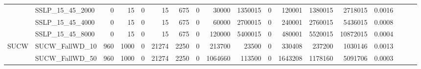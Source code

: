 \begin{landscape}
\begin{longtable}[c]{llrrrrrrrrrrrrrlll}
		& SSLP\_15\_45\_2000           & 0                           & 15                         & 0                          & 15                          & 675                        & 0                          & 30000                      & 1350015                   & 0                         & 120001                     & 1380015                    & 2718015                        & 0.0016                        &                          &                          &                          \\
		& SSLP\_15\_45\_4000           & 0                           & 15                         & 0                          & 15                          & 675                        & 0                          & 60000                      & 2700015                   & 0                         & 240001                     & 2760015                    & 5436015                        & 0.0008                        &                          &                          &                          \\
		& SSLP\_15\_45\_8000           & 0                           & 15                         & 0                          & 15                          & 675                        & 0                          & 120000                     & 5400015                   & 0                         & 480001                     & 5520015                    & 10872015                       & 0.0004                        &                          &                          &                          \\ \hline
		\multirow{24}{*}{SUCW}      & SUCW\_FallWD\_10             & 960                         & 1000                       & 0                          & 21274                       & 2250                       & 0                          & 213700                     & 23500                     & 0                         & 330408                     & 237200                     & 1030146                        & 0.0013                        &                          &                          &                          \\
		& SUCW\_FallWD\_50             & 960                         & 1000                       & 0                          & 21274                       & 2250                       & 0                          & 1064660                    & 113500                    & 0                         & 1643208                    & 1178160                    & 5091706                        & 0.0003                        &                          &                          &                          \\

\end{longtable}
\end{landscape}
